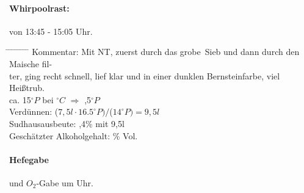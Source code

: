 \documentclass[12pt,oneside,a4paper]{scrartcl}
\begin{document}
{\paragraph{Whirpoolrast:} von 13:45 - 15:05 Uhr.
	\begin{tabbing}
		\hspace{1cm} \= \hspace{1cm} \= \hspace{1cm} \= \hspace{1cm} \= \hspace{1cm} \= \hspace{1cm} \= \hspace{1cm} \= \hspace{1cm} \= \kill
		\> Kommentar: \>\>\> Mit NT, zuerst durch das \glq grobe\grq\ Sieb und dann durch den Maische fil-\\
		\>\>\>\>ter, ging recht schnell, lief klar und in einer dunklen Bernsteinfarbe, viel\\
		\>\>\>\>Heißtrub.\\
		\> \> \> ca. 15$^\circ P$ \> \> bei $^\circ C$ \> $\Rightarrow$ ,5$^\circ P$\\
		\> \> Verdünnen: \> \> \> \> \> ($7,5l \cdot$$ 16.5^\circ P)/$($14^\circ P)= 9,5l$\\
		\> \> Sudhausausbeute: \> \> \> \> ,4\% mit 9,5l\\
		\> \> Geschätzter Alkoholgehalt: \> \> \> \> \% Vol.
	\end{tabbing}
%
\paragraph{Hefegabe} und $O_2$-Gabe um  Uhr.
%
}
\end{document}

